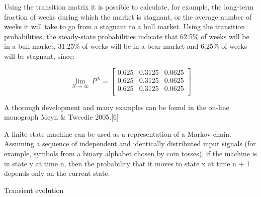 Using the transition matrix it is possible to calculate, for example, the long-term fraction of weeks during which the market is stagnant, or the average number of weeks it will take to go from a stagnant to a bull market. Using the transition probabilities, the steady-state probabilities indicate that 62.5\% of weeks will be in a bull market, 31.25\% of weeks will be in a bear market and 6.25\% of weeks will be stagnant, since:

\[\lim_{N\to \infty } \, P^N=
\begin{bmatrix}
 0.625 & 0.3125 & 0.0625 \\
 0.625 & 0.3125 & 0.0625 \\
 0.625 & 0.3125 & 0.0625 \\
\end{bmatrix}\]

A thorough development and many examples can be found in the on-line monograph Meyn & Tweedie 2005.[6]

A finite state machine can be used as a representation of a Markov chain. Assuming a sequence of independent and identically distributed input signals (for example, symbols from a binary alphabet chosen by coin tosses), if the machine is in state y at time n, then the probability that it moves to state x at time n + 1 depends only on the current state.

Transient evolution


